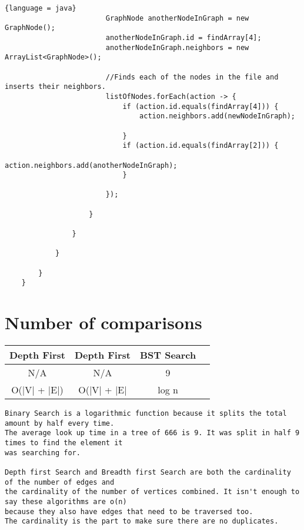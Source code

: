 \documentclass{article}
\begin{document}
\begin{lstlisting}{language = java}
                        GraphNode anotherNodeInGraph = new GraphNode();
                        anotherNodeInGraph.id = findArray[4];
                        anotherNodeInGraph.neighbors = new ArrayList<GraphNode>();

                        //Finds each of the nodes in the file and inserts their neighbors.
                        listOfNodes.forEach(action -> {
                            if (action.id.equals(findArray[4])) {
                                action.neighbors.add(newNodeInGraph);

                            }
                            if (action.id.equals(findArray[2])) {
                                action.neighbors.add(anotherNodeInGraph);
                            }

                        });

                    }

                }

            }

        }
    }
\end{lstlisting}
\section{Number of comparisons}
\begin{center}
\begin{tabular}{||c c c c||} 
 \hline
Depth First & Depth First & BST Search\\[0.5ex] 
 \hline\hline
N/A & N/A & 9 \\ 
 \hline
 O(|V| + |E|) & O(|V| + |E| & log n  \\
 \hline
\end{tabular}
\end{center}
\begin{lstlisting}
Binary Search is a logarithmic function because it splits the total amount by half every time.
The average look up time in a tree of 666 is 9. It was split in half 9 times to find the element it 
was searching for.

Depth first Search and Breadth first Search are both the cardinality of the number of edges and 
the cardinality of the number of vertices combined. It isn't enough to say these algorithms are o(n) 
because they also have edges that need to be traversed too. 
The cardinality is the part to make sure there are no duplicates.
\end{lstlisting}
\end{document}
